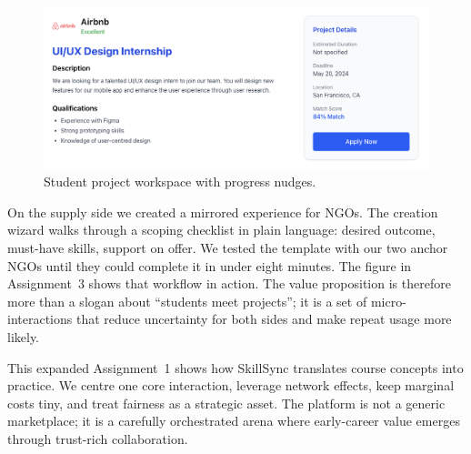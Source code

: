 \begin{figure}[H]
  \centering
  \includegraphics[width=0.85\linewidth]{figures/Student-Project-View.png}
  \caption{Student project workspace with progress nudges.}
  \label{fig:student-view}
\end{figure}

On the supply side we created a mirrored experience for NGOs. The creation wizard walks through a scoping checklist in plain language: desired outcome, must-have skills, support on offer. We tested the template with our two anchor NGOs until they could complete it in under eight minutes. The figure in Assignment~3 shows that workflow in action. The value proposition is therefore more than a slogan about ``students meet projects''; it is a set of micro-interactions that reduce uncertainty for both sides and make repeat usage more likely.

This expanded Assignment~1 shows how SkillSync translates course concepts into practice. We centre one core interaction, leverage network effects, keep marginal costs tiny, and treat fairness as a strategic asset. The platform is not a generic marketplace; it is a carefully orchestrated arena where early-career value emerges through trust-rich collaboration.
